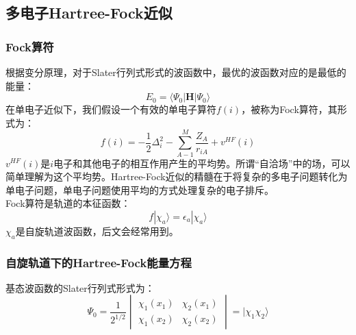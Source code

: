 \documentclass[12pt, a4paper, oneside]{ctexart}
\begin{document}
\subsection{多电子Hartree-Fock近似}
\subsubsection{Fock算符}
根据变分原理，对于Slater行列式形式的波函数中，最优的波函数对应的是最低的能量：
\begin{equation}
E_0=\langle\Psi_0|\mathbf{H}|\Psi_0\rangle
\end{equation}
在单电子近似下，我们假设一个有效的单电子算符$f(i)$，被称为Fock算符，其形式为：
\begin{equation}
f(i)=-\frac12\Delta_i^2-\sum_{A-1}^M\frac{Z_A}{r_{iA}}+v^{HF}(i)
\end{equation}
$v^{HF}(i)$是$i$电子和其他电子的相互作用产生的平均势。所谓“自洽场”中的场，可以简单理解为这个平均势。Hartree-Fock近似的精髓在于将复杂的多电子问题转化为单电子问题，单电子问题使用平均的方式处理复杂的电子排斥。\\
Fock算符是轨道的本征函数：
\begin{equation}
f|\chi_a\rangle=\epsilon_a|\chi_a\rangle
\end{equation}
$\chi_a$是自旋轨道波函数，后文会经常用到。
\subsubsection{自旋轨道下的Hartree-Fock能量方程}
基态波函数的Slater行列式形式为：
\begin{equation}
\Psi_0=\frac1{2^{1/2}}
\begin{vmatrix}
\chi_1(x_1) & \chi_2(x_1)\\
\chi_1(x_2) & \chi_2(x_2)
\end{vmatrix}
=|\chi_1\chi_2\rangle
\end{equation}
\end{document}
